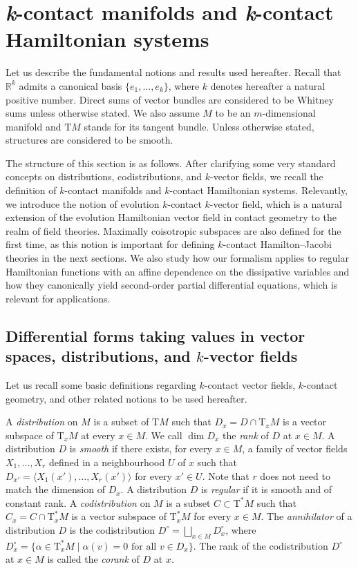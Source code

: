 \documentclass[11pt,twoside]{article}
\theoremstyle{plain}
\theoremstyle{definition}
\theoremstyle{remark}
\newcommand{\T}{\mathrm{T}}
\newcommand{\cT}{\mathrm{T}^\ast}
\begin{document}
\section{{\it k}-contact manifolds and {\it k}-contact Hamiltonian systems}
\label{sec:2}

Let us describe the fundamental notions and results used hereafter. Recall that $\mathbb{R}^k$ admits a canonical basis $\{e_1,\dotsc,e_k\}$, where $k$ denotes hereafter a natural positive number. Direct sums of vector bundles are considered to be Whitney sums unless otherwise stated.  We also assume $M$ to be an $m$-dimensional manifold and $\T M$ stands for its tangent bundle. Unless otherwise stated, structures are considered to be smooth.

The structure of this section is as follows. After clarifying some very standard concepts on distributions, codistributions, and $k$-vector fields, we recall the definition of $k$-contact manifolds and $k$-contact Hamiltonian systems. Relevantly, we introduce the notion of evolution $k$-contact $k$-vector field, which is a natural extension of the evolution Hamiltonian vector field in contact geometry \cite{LL_19} to the realm of field theories. Maximally coisotropic subspaces are also defined for the first time, as this notion is important for defining $k$-contact Hamilton--Jacobi theories in the next sections. We also study how our formalism applies to regular Hamiltonian functions with an affine dependence on the dissipative variables and how they canonically yield second-order partial differential equations, which is relevant for applications.

\subsection{Differential forms taking values in vector spaces, distributions, and \texorpdfstring{$k$}{}-vector fields}

 Let us recall some basic definitions regarding $k$-contact vector fields, $k$-contact geometry, and other related notions to be used hereafter.

 
A \textit{distribution} on $M$ is a subset of $\T M$ such that $D_x = D\cap\T_xM$ is a vector subspace of $\T_xM$ at every $x\in M$. We call $\dim D_x$ the {\it rank} of $D$ at $x\in M$. A distribution $D$ is \textit{smooth} if there exists, for every $x\in M$, a family of vector fields $X_1, \dotsc, X_r$ defined in a neighbourhood $U$ of $x$ such that $D_{x'}=\langle X_1(x'), \dotsc, X_r(x')\rangle$ for every $x'\in U$. Note that $r$ does not need to match the dimension of $D_x$.  A distribution $D$ is \textit{regular} if it is smooth and of constant rank. A \textit{codistribution} on $M$ is a subset $C\subset\cT M$ such that $C_x = C\cap\cT_xM$ is a vector subspace of $\cT_x M$ for every $x\in M$. The {\it annihilator} of a distribution $D$ is the codistribution $D^\circ=\bigsqcup_{x\in M} D^\circ_x$, where $D_x^\circ = \{\alpha \in \T_x^*M \mid \alpha(v)=0 \text{ for all } v \in D_x\}$. The rank of the codistribution $D^\circ$ at $x\in M$ is called the {\it corank} of $D$ at $x$.
 
\end{document}

